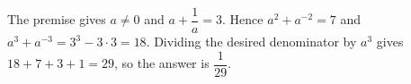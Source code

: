 The premise gives $a\ne0$ and $a+\dfrac{1}{a}=3$. Hence $a^2+a^{-2}=7$ and $a^3+a^{-3}=3^3-3\cdot3=18$. Dividing the desired denominator by $a^3$ gives $18+7+3+1=29$, so the answer is $\boxed{\dfrac{1}{29}}$.

